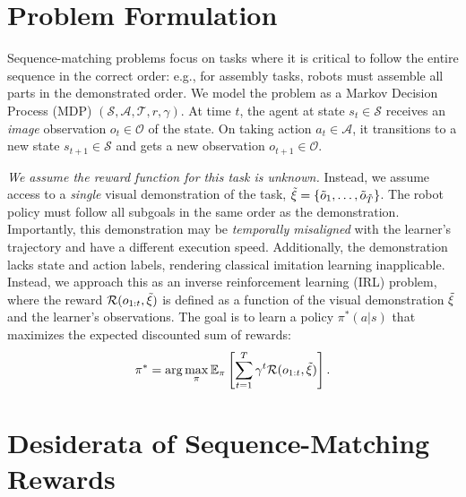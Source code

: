 \section{Problem Formulation}
Sequence-matching problems focus on tasks where it is critical to follow the entire sequence in the correct order: e.g., for assembly tasks, robots must assemble all parts in the demonstrated order. 
We model the problem as a Markov Decision Process (MDP) $(\mathcal{S}, \mathcal{A}, \mathcal{T}, r, \gamma)$. At time $t$, the agent at state $s_t \in \mathcal{S}$ receives an \emph{image} observation $o_t \in \mathcal{O}$ of the state. On taking action $a_t \in \mathcal{A}$, it transitions to a new state $s_{t+1} \in \mathcal{S}$ and gets a new observation $o_{t+1} \in \mathcal{O}$.

\emph{We assume the reward function for this task is unknown.} Instead, we assume access to a \emph{single} visual demonstration of the task, $\tilde{\xi} = \{\tilde{o}_1, \dots, \tilde{o}_{\tilde{T}}\}$.
The robot policy must follow all subgoals in the same order as the demonstration.
Importantly, this demonstration may be \emph{temporally misaligned} with the learner’s trajectory and have a different execution speed. 
Additionally, the demonstration lacks state and action labels, rendering classical imitation learning inapplicable. 
Instead, we approach this as an inverse reinforcement learning (IRL) problem, where the reward $\mathcal{R}(o_{1:t}, \tilde{\xi})$ is defined as a function of the visual demonstration $\tilde{\xi}$ and the learner's observations.
The goal is to learn a policy $\pi^*(a | s)$ that maximizes the expected discounted sum of rewards:
\begin{equation*}
    \pi^* = \arg\max_\pi \mathbb{E}_{\pi} \left[ \sum_{t=1}^{T} \gamma^t \mathcal{R}(o_{1:t}, \tilde{\xi}) \right].
\end{equation*}

\section{Desiderata of Sequence-Matching Rewards\label{sec:desiderata}}
\label{sec:dist_fail}

